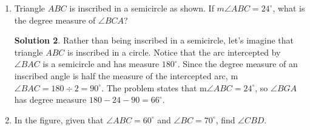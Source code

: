 \documentclass{article}
\theoremstyle{definition}
\newtheorem*{solution}{Solution}
\begin{document}
\begin{multicols}{2}
\begin{enumerate}
\begin{solution}
                Finally, $\angle E = \angle AGB$ because they are inscribed angles subtending the same arc.
                Thus, $\angle E = \angle AGB = \angle DGC = \angle F$.
            \end{solution}
        \item Triangle $ABC$ is inscribed in a semicircle as shown.
            If $m\angle ABC = 24^{\circ}$, what is the degree measure of $\angle BCA$?
            \begin{center}
            \end{center}
            \begin{solution}
                Rather than being inscribed in a semicircle, let's imagine that triangle $ABC$ is inscribed in a circle.
                Notice that the arc intercepted by $\angle BAC$ is a semicircle and has measure $180^{\circ}$.
                Since the degree measure of an inscribed angle is half the measure of the intercepted arc, m$\angle BAC = 180 \div 2 = 90^{\circ}$.
                The problem states that m$\angle ABC = 24^{\circ}$, so $\angle BGA$ has degree measure $180 - 24 - 90 = 66^{\circ}$.
            \end{solution}
        \item In the figure, given that $\angle ABC = 60^{\circ}$ and $\angle BC = 70^{\circ}$, find $\angle CBD$.
            \begin{center}
\end{center}
\end{enumerate}
\end{multicols}
\end{document}
